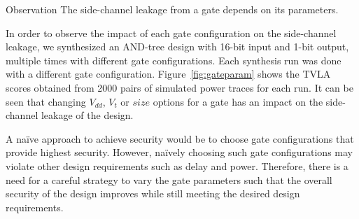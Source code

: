 \begin{namedthm}{Observation }
The side-channel leakage from a gate depends on its  parameters.
\end{namedthm}
In order to observe the impact of each gate configuration on the side-channel leakage, we synthesized an AND-tree design with 16-bit input and 1-bit output, multiple times with different gate configurations. Each synthesis run was done with a different gate configuration. Figure~\ref{fig:gateparam} shows the TVLA scores obtained from 2000 pairs of simulated power traces for each run. It can be seen that changing 
$V_{dd}$, $V_t$ or $size$ options for a gate has an impact on the side-channel leakage of the design.


A na\"ive approach to achieve security would be to choose gate configurations that provide highest security. However,  na\"ively choosing such gate configurations may violate other design requirements such as delay and power. 
Therefore, there is a need for a careful strategy to vary the gate parameters such that the overall security of the design improves while still meeting the desired design requirements.  
\vspace{-3pt}

